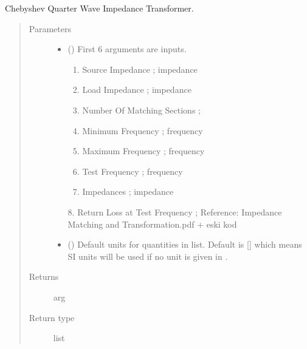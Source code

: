 \documentclass[letterpaper,10pt,english]{sphinxmanual}
\begin{document}

\begin{fulllineitems}
\label{\detokenize{components:components.Chebyshev_QWave_Impedance_Transformer}}
Chebyshev Quarter Wave Impedance Transformer.
\begin{quote}\begin{description}
\item[{Parameters}] \leavevmode\begin{itemize}
\item {} 
 () \textendash{} 
First 6 arguments are inputs.
\begin{enumerate}
%
\item {} 
Source Impedance ; impedance

\item {} 
Load Impedance ; impedance

\item {} 
Number Of Matching Sections ;

\item {} 
Minimum Frequency ; frequency

\item {} 
Maximum Frequency ; frequency

\item {} 
Test Frequency ; frequency

\item {} 
Impedances ; impedance

\end{enumerate}

8.  Return Loss at Test Frequency ;
Reference:  Impedance Matching and Transformation.pdf + eski kod


\item {} 
 (\sphinxstyleliteralemphasis{\sphinxupquote{, }}) \textendash{} Default units for quantities in  list. Default is {[}{]} which means SI units will be used if no unit is given in .

\end{itemize}

\item[{Returns}] \leavevmode
arg

\item[{Return type}] \leavevmode
list

\end{description}\end{quote}

\end{fulllineitems}
\end{document}
